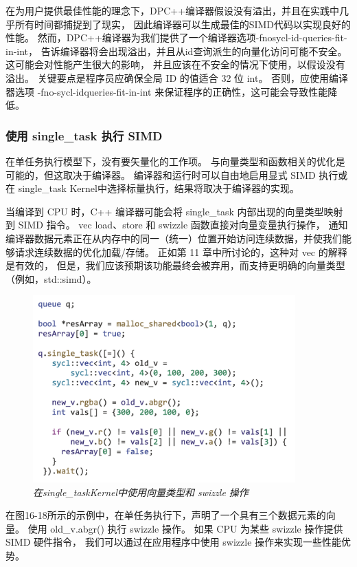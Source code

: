 在为用户提供最佳性能的理念下，DPC++编译器假设没有溢出，并且在实践中几乎所有时间都捕捉到了现实，
因此编译器可以生成最佳的SIMD代码以实现良好的性能。 
然而，DPC++编译器为我们提供了一个编译器选项-fnosycl-id-queries-fit-in-int，
告诉编译器将会出现溢出，并且从id查询派生的向量化访问可能不安全。 这可能会对性能产生很大的影响，
并且应该在不安全的情况下使用，以假设没有溢出。 关键要点是程序员应确保全局 ID 的值适合 32 位 int。 
否则，应使用编译器选项 -fno-sycl-idqueries-fit-in-int 来保证程序的正确性，这可能会导致性能降低。

\subsubsection{使用 single\_task 执行 SIMD}
在单任务执行模型下，没有要矢量化的工作项。 与向量类型和函数相关的优化是可能的，但这取决于编译器。 
编译器和运行时可以自由地启用显式 SIMD 执行或在 single\_task Kernel中选择标量执行，结果将取决于编译器的实现。

当编译到 CPU 时，C++ 编译器可能会将 single\_task 内部出现的向量类型映射到 SIMD 指令。 
vec load、store 和 swizzle 函数直接对向量变量执行操作，
通知编译器数据元素正在从内存中的同一（统一）位置开始访问连续数据，并使我们能够请求连续数据的优化加载/存储。 
正如第 11 章中所讨论的，这种对 vec 的解释是有效的，
但是，我们应该预期该功能最终会被弃用，而支持更明确的向量类型（例如，std::simd）。

\begin{figure}[H]
	\centering
	\includegraphics[width=0.9\textwidth]{figs/F16.18.png}
	\caption{\textit{在single\_taskKernel中使用向量类型和 swizzle 操作 }}
\end{figure}

在图16-18所示的示例中，在单任务执行下，声明了一个具有三个数据元素的向量。 
使用 old\_v.abgr() 执行 swizzle 操作。 如果 CPU 为某些 swizzle 操作提供 SIMD 硬件指令，
我们可以通过在应用程序中使用 swizzle 操作来实现一些性能优势。

